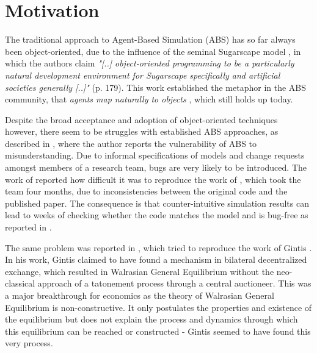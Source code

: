 \chapter{Motivation}
\label{ch:motivation}
The traditional approach to Agent-Based Simulation (ABS) has so far always been object-oriented, due to the influence of the seminal Sugarscape model \cite{epstein_growing_1996}, in which the authors claim \textit{"[..] object-oriented programming to be a particularly natural development environment for Sugarscape specifically and artificial societies generally [..]"} (p. 179). This work established the metaphor in the ABS community, that \textit{agents map naturally to objects} \cite{north_managing_2007}, which still holds up today.

Despite the broad acceptance and adoption of object-oriented techniques however, there seem to be struggles with established ABS approaches, as described in \cite{axelrod_chapter_2006}, where the author reports the vulnerability of ABS to misunderstanding. Due to informal specifications of models and change requests amongst members of a research team, bugs are very likely to be introduced. The work of \cite{axtell_aligning_1996} reported how difficult it was to reproduce the work of \cite{axelrod_convergence_1995}, which took the team four months, due to inconsistencies between the original code and the published paper. The consequence is that counter-intuitive simulation results can lead to weeks of checking whether the code matches the model and is bug-free as reported in \cite{axelrod_advancing_1997}.

The same problem was reported in \cite{ionescu_dependently-typed_2012}, which tried to reproduce the work of Gintis \cite{gintis_emergence_2006}. In his work, Gintis claimed to have found a mechanism in bilateral decentralized exchange, which resulted in Walrasian General Equilibrium without the neo-classical approach of a tatonement process through a central auctioneer. This was a major breakthrough for economics as the theory of Walrasian General Equilibrium is non-constructive. It only postulates the properties and existence of the equilibrium \cite{colell_microeconomic_1995} but does not explain the process and dynamics through which this equilibrium can be reached or constructed - Gintis seemed to have found this very process.

